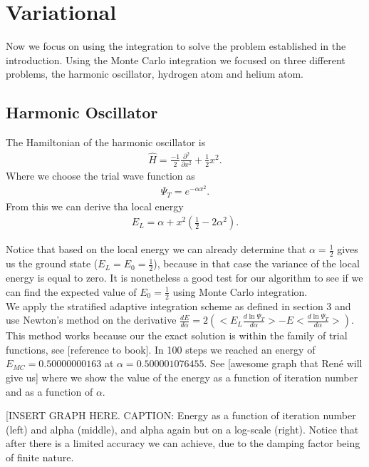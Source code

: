 
\section{Variational}
 Now we focus on using the integration to solve the problem established in the introduction.
 Using the Monte Carlo integration we focused on three different problems, the harmonic oscillator,
 hydrogen atom and helium atom.

\subsection{Harmonic Oscillator}
The Hamiltonian of the harmonic oscillator is
\begin{align*}
  \hat{H} = \frac{-1}{2}\frac{\partial^2}{ \partial x^2} + \frac{1}{2} x^2.
\end{align*}
Where we choose the trial wave function as
  \begin{align*}
    \Psi_T = e^{-\alpha x^2}.
  \end{align*}
From this we can derive tha local energy
  \begin{align*}
    E_L = \alpha + x^2(\frac{1}{2} - 2\alpha^2).
  \end{align*}
 	
  Notice that based on the local energy we can already determine that $\alpha = \frac{1}{2}$ gives us the ground state ($E_L = E_0 = \frac{1}{2}$), because in that case the variance of the local energy is equal to zero. It is nonetheless a good test for our algorithm to see if we can find the expected value of $E_0 = \frac{1}{2}$ using Monte Carlo integration.  \\
  
We apply the stratified adaptive integration scheme as defined in section 3 and use Newton's method on the derivative $\frac{dE}{d\alpha} = 2 (<E_L \frac{d \ln \Psi_T}{d \alpha}> - E<\frac{d \ln \Psi_T}{d \alpha}>)$. This method works because our the exact solution is within the family of trial functions, see [reference to book]. In 100 steps we reached an energy of $E_{MC} = 0.50000000163$ at $\alpha = 0.500001076455$.  See [awesome graph that Ren\'e will give us] where we show the value of the energy as a function of iteration number and as a function of $\alpha$. 

[INSERT GRAPH HERE. CAPTION: Energy as a function of iteration number (left) and alpha (middle), and alpha again but on a log-scale (right). Notice that after there is a limited accuracy we can achieve, due to the damping factor being of finite nature.  
  

